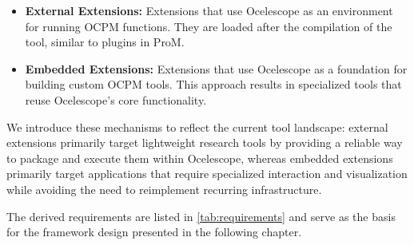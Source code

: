 \begin{itemize}
	\item \textbf{External Extensions:} Extensions that use Ocelescope as an environment for running OCPM functions. They are loaded after the compilation of the tool, similar to plugins in ProM.
	\item \textbf{Embedded Extensions:} Extensions that use Ocelescope as a foundation for building custom OCPM tools. This approach results in specialized tools that reuse Ocelescope’s core functionality.
\end{itemize}

We introduce these mechanisms to reflect the current tool landscape: external extensions primarily target lightweight research tools by providing a reliable way to package and execute them within Ocelescope, whereas embedded extensions primarily target applications that require specialized interaction and visualization while avoiding the need to reimplement recurring infrastructure.

The derived requirements are listed in \autoref{tab:requirements} and serve as the basis for the framework design presented in the following chapter.


